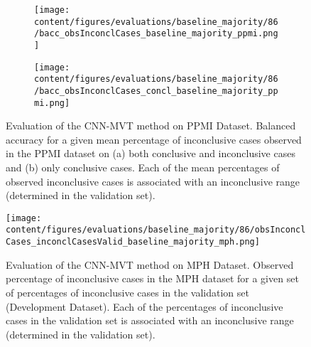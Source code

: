 \begin{figure}[t]
\begin{subfigure}{0.9\textwidth}
  \centering
  \texttt{[image: content/figures/evaluations/baseline\_majority/86/bacc\_obsInconclCases\_baseline\_majority\_ppmi.png]}
  \subcaption{}
  \label{fig:bacc_obsInconclCases_baseline_majority_ppmi}
\end{subfigure}
\hfill
\begin{subfigure}{0.9\textwidth}
  \centering
  \texttt{[image: content/figures/evaluations/baseline\_majority/86/bacc\_obsInconclCases\_concl\_baseline\_majority\_ppmi.png]}
  \subcaption{}
  \label{fig:bacc_obsInconclCases_concl_baseline_majority_ppmi}
\end{subfigure}

\caption{Evaluation of the CNN-MVT method on PPMI Dataset.
Balanced accuracy for a given mean percentage of inconclusive cases observed in the PPMI dataset on 
(a) both conclusive and inconclusive cases and (b) only conclusive cases. 
Each of the mean percentages of observed inconclusive cases is associated 
with an inconclusive range (determined in the validation set). }
\label{fig:bacc_obsInconclCases_baseline_majority_ppmi_full}
\end{figure}





\begin{figure}[h]
\centering
\texttt{[image: content/figures/evaluations/baseline\_majority/86/obsInconclCases\_inconclCasesValid\_baseline\_majority\_mph.png]}
\caption{Evaluation of the CNN-MVT method on MPH Dataset.
Observed percentage of inconclusive cases in the MPH dataset 
for a given set of percentages of inconclusive cases in the validation set (Development Dataset).
Each of the percentages of inconclusive cases in the validation set is associated 
with an inconclusive range (determined in the validation set).} 
\label{fig:obsInconclCases_inconclCasesValid_baseline_majority_mph}
\end{figure} 


